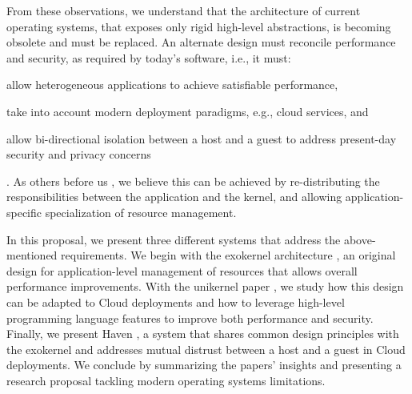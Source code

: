 From these observations, we understand that the architecture of current operating systems, that exposes only rigid high-level abstractions, is becoming obsolete and must be replaced.
An alternate design must reconcile performance and security, as required by today's software, i.e., it must:
\begin{enumerate*}
	\item allow heterogeneous applications to achieve satisfiable performance,
	\item take into account modern deployment paradigms, e.g., cloud services, and 
	\item allow bi-directional isolation between a host and a guest to address present-day security and privacy concerns
\end{enumerate*}.
As others before us \cite{DBLP:conf/sosp/EnglerKO95,DBLP:conf/hotos/EnglerK95,DBLP:conf/sosp/KaashoekEGBHMPGM97,DBLP:journals/tocs/CaoFKL96,DBLP:journals/sigops/HartyC92}, we believe this can be achieved by re-distributing the responsibilities between the application and the kernel, and allowing application-specific specialization of resource management.

In this proposal, we present three different systems that address the above-mentioned requirements.
We begin with the exokernel architecture \cite{DBLP:conf/sosp/EnglerKO95}, an original design for application-level management of resources that allows overall performance improvements.
With the unikernel paper \cite{DBLP:conf/asplos/MadhavapeddyMRSSGSHC13}, we study how this design can be adapted to Cloud deployments and how to leverage high-level programming language features to improve both performance and security.
Finally, we present Haven \cite{DBLP:journals/tocs/BaumannPH15}, a system that shares common design principles with the exokernel and addresses mutual distrust between a host and a guest in Cloud deployments.
We conclude by summarizing the papers' insights and presenting a research proposal tackling modern operating systems limitations.







